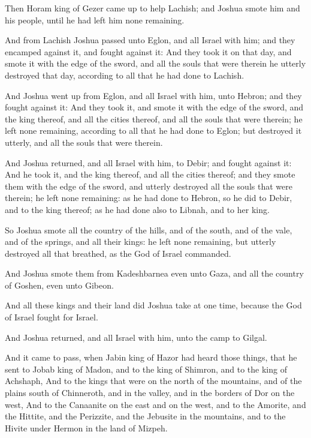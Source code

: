\Verse Then Horam king of Gezer came up to help Lachish; and Joshua smote him and his people, until he had left him none remaining.

\Verse And from Lachish Joshua passed unto Eglon, and all Israel with him; and they encamped against it, and fought against it: \Verse And they took it on that day, and smote it with the edge of the sword, and all the souls that were therein he utterly destroyed that day, according to all that he had done to Lachish.

\Verse And Joshua went up from Eglon, and all Israel with him, unto Hebron; and they fought against it: \Verse And they took it, and smote it with the edge of the sword, and the king thereof, and all the cities thereof, and all the souls that were therein; he left none remaining, according to all that he had done to Eglon; but destroyed it utterly, and all the souls that were therein.

\Verse And Joshua returned, and all Israel with him, to Debir; and fought against it: \Verse And he took it, and the king thereof, and all the cities thereof; and they smote them with the edge of the sword, and utterly destroyed all the souls that were therein; he left none remaining: as he had done to Hebron, so he did to Debir, and to the king thereof; as he had done also to Libnah, and to her king.

\Verse So Joshua smote all the country of the hills, and of the south, and of the vale, and of the springs, and all their kings: he left none remaining, but utterly destroyed all that breathed, as the \LORD God of Israel commanded.

\Verse And Joshua smote them from Kadeshbarnea even unto Gaza, and all the country of Goshen, even unto Gibeon.

\Verse And all these kings and their land did Joshua take at one time, because the \LORD God of Israel fought for Israel.

\Verse And Joshua returned, and all Israel with him, unto the camp to Gilgal.


\Chapter
\Verse And it came to pass, when Jabin king of Hazor had heard those things, that he sent to Jobab king of Madon, and to the king of Shimron, and to the king of Achshaph, \Verse And to the kings that were on the north of the mountains, and of the plains south of Chinneroth, and in the valley, and in the borders of Dor on the west, \Verse And to the Canaanite on the east and on the west, and to the Amorite, and the Hittite, and the Perizzite, and the Jebusite in the mountains, and to the Hivite under Hermon in the land of Mizpeh.

